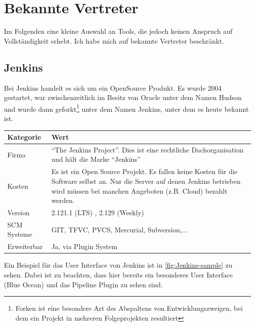 \section{Bekannte Vertreter}
Im Folgenden eine kleine Auswahl an Tools, die jedoch keinen Anspruch auf Vollständigkeit erhebt. Ich habe mich auf bekannte Vertreter beschränkt.
\subsection{Jenkins}
Bei Jenkins handelt es sich um ein OpenSource Produkt. Es wurde 2004 gestartet, war zwischenzeitlich im Besitz von Oracle unter dem Namen Hudson und wurde dann geforkt\footnote{Forken ist eine besondere Art des Abspaltens von Entwicklungszweigen, bei dem ein Projekt in mehreren Folgeprojekten resultiert} unter dem Namen Jenkins, unter dem es heute bekannt ist. 
\begin{center}
  \begin{tabularx}{\textwidth}{lX}
    \toprule
    Kategorie & Wert \\
    \midrule
    Firma & "`The Jenkins Project"'. Dies ist eine rechtliche Dachorganisation und hält die Marke "`Jenkins"' \\
		\addlinespace
    Kosten & Es ist ein Open Source Projekt. Es fallen keine Kosten für die Software selbst an. Nur die Server auf denen Jenkins betrieben wird müssen bei manchen Angeboten (z.B. Cloud) bezahlt werden. \\
		\addlinespace
		Version & 2.121.1 (LTS) , 2.129 (Weekly) \\
		\addlinespace
		SCM Systeme & GIT, TFVC, PVCS, Mercurial, Subversion,...\\
		\addlinespace
		Erweiterbar & Ja, via Plugin System\\
    \bottomrule
  \end{tabularx}
\end{center}
Ein Beispiel für das User Interface von Jenkins ist in \autoref{fig:Jenkins-sample} zu sehen. Dabei ist zu beachten, dass hier bereits ein besonderes User Interface (Blue Ocean) und das Pipeline Plugin zu sehen sind. 
